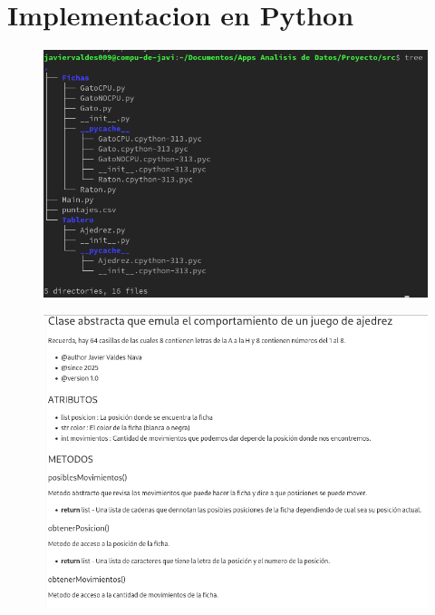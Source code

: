 \documentclass[12pt, Tahoma]{article}
\begin{document}
	\section*{Implementacion en Python}
	\begin{figure}[H]
		\centering
		\includegraphics[scale=0.6]{Paquetes2.png}
	\end{figure}
	\begin{figure}[H]
		\centering
		\includegraphics[scale=0.6]{ClaseAjedrez1.png}
	\end{figure}
\end{document}
